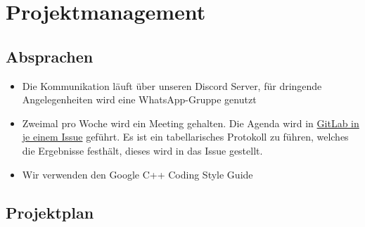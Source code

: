 \chapter{Projektmanagement}\label{ch:projektmanagement}






\section{Absprachen}\label{sec:absprachen}

\begin{itemize}
    \item Die Kommunikation läuft über unseren Discord Server, für dringende Angelegenheiten
    wird eine WhatsApp-Gruppe genutzt
    \item Zweimal pro Woche wird ein Meeting gehalten.
    Die Agenda wird in
    \href{https://git.haw-hamburg.de/ss21-esep-gruppe-2.3/esep/-/boards/2082?label_name[]=Protokoll}
    {GitLab in je einem Issue} geführt.
    Es ist ein tabellarisches Protokoll zu führen, welches die Ergebnisse festhält, dieses wird
    in das Issue gestellt.
    \item Wir verwenden den Google C++ Coding Style Guide
\end{itemize}



\section{Projektplan}\label{sec:projektplan}

